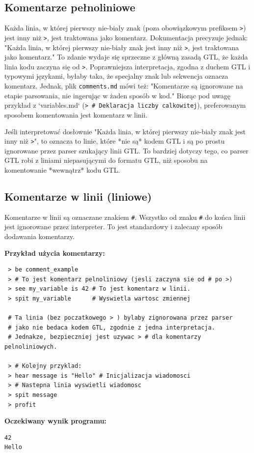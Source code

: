 \documentclass[12pt,a4paper]{article}
\begin{document}
\subsection{Komentarze pełnoliniowe}
Każda linia, w której pierwszy nie-biały znak (poza obowiązkowym prefiksem \texttt{>}) jest inny niż \texttt{>}, jest traktowana jako komentarz. Dokumentacja precyzuje jednak: "Każda linia, w której pierwszy nie-biały znak jest inny niż \texttt{>}, jest traktowana jako komentarz." To zdanie wydaje się sprzeczne z główną zasadą GTL, że każda linia kodu zaczyna się od \texttt{>}.
Poprawniejsza interpretacja, zgodna z duchem GTL i typowymi językami, byłaby taka, że specjalny znak lub sekwencja oznacza komentarz.
Jednak, plik \texttt{comments.md} mówi też: "Komentarze są ignorowane na etapie parsowania, nie ingerując w żaden sposób w kod."
Biorąc pod uwagę przykład z `variables.md` (\texttt{> # Deklaracja liczby calkowitej}), preferowanym sposobem komentowania jest komentarz w linii.

Jeśli interpretować dosłownie "Każda linia, w której pierwszy nie-biały znak jest inny niż \texttt{>}", to oznacza to linie, które *nie są* kodem GTL i są po prostu ignorowane przez parser szukający linii GTL. To bardziej dotyczy tego, co parser GTL robi z liniami niepasującymi do formatu GTL, niż sposobu na komentowanie *wewnątrz* kodu GTL.

\subsection{Komentarze w linii (liniowe)}
Komentarze w linii są oznaczane znakiem \texttt{\#}. Wszystko od znaku \texttt{\#} do końca linii jest ignorowane przez interpreter. To jest standardowy i zalecany sposób dodawania komentarzy.

\textbf{Przykład użycia komentarzy:}
\begin{lstlisting}
 > be comment_example
 > # To jest komentarz pelnoliniowy (jesli zaczyna sie od # po >)
 > see my_variable is 42 # To jest komentarz w linii.
 > spit my_variable      # Wyswietla wartosc zmiennej

 # Ta linia (bez poczatkowego > ) bylaby zignorowana przez parser
 # jako nie bedaca kodem GTL, zgodnie z jedna interpretacja.
 # Jednakze, bezpieczniej jest uzywac > # dla komentarzy pelnoliniowych.

 > # Kolejny przyklad:
 > hear message is "Hello" # Inicjalizacja wiadomosci
 > # Nastepna linia wyswietli wiadomosc
 > spit message
 > profit
\end{lstlisting}
\textbf{Oczekiwany wynik programu:}
\begin{verbatim}
42
Hello
\end{verbatim}
\end{document}
